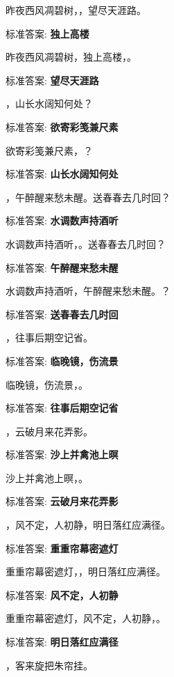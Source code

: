 \documentclass[12pt, a4paper, addpoints]{exam}
\begin{document}
\begin{questions}
\question[1] 昨夜西风凋碧树，\uline{\qquad\qquad\qquad}，望尽天涯路。

标准答案: \textbf{独上高楼}

\question[1] 昨夜西风凋碧树，独上高楼，\uline{\qquad\qquad\qquad}。

标准答案: \textbf{望尽天涯路}

\question[1] \uline{\qquad\qquad\qquad}，山长水阔知何处？

标准答案: \textbf{欲寄彩笺兼尺素}

\question[1] 欲寄彩笺兼尺素，\uline{\qquad\qquad\qquad}？

标准答案: \textbf{山长水阔知何处}

\question[1] \uline{\qquad\qquad\qquad}，午醉醒来愁未醒。送春春去几时回？

标准答案: \textbf{水调数声持酒听}

\question[1] 水调数声持酒听，\uline{\qquad\qquad\qquad}。送春春去几时回？

标准答案: \textbf{午醉醒来愁未醒}

\question[1] 水调数声持酒听，午醉醒来愁未醒。\uline{\qquad\qquad\qquad}？

标准答案: \textbf{送春春去几时回}

\question[1] \uline{\qquad\qquad\qquad}，往事后期空记省。

标准答案: \textbf{临晚镜，伤流景}

\question[1] 临晚镜，伤流景，\uline{\qquad\qquad\qquad}。

标准答案: \textbf{往事后期空记省}

\question[1] \uline{\qquad\qquad\qquad}，云破月来花弄影。

标准答案: \textbf{沙上并禽池上暝}

\question[1] 沙上并禽池上暝，\uline{\qquad\qquad\qquad}。

标准答案: \textbf{云破月来花弄影}

\question[1] \uline{\qquad\qquad\qquad}，风不定，人初静，明日落红应满径。

标准答案: \textbf{重重帘幕密遮灯}

\question[1] 重重帘幕密遮灯，\uline{\qquad\qquad\qquad}，明日落红应满径。

标准答案: \textbf{风不定，人初静}

\question[1] 重重帘幕密遮灯，风不定，人初静，\uline{\qquad\qquad\qquad}。

标准答案: \textbf{明日落红应满径}

\question[1] \uline{\qquad\qquad\qquad}，客来旋把朱帘挂。


\end{questions}
\end{document}
